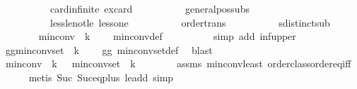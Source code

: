 \begin{isabellebody}
\ \ \ \ \ \ \ \ \ \ card{\isachardot}{\kern0pt}infinite\ ex{\isacharunderscore}{\kern0pt}card\isanewline
\ \ \ \ \ \ \ \ \ \ general{\isacharunderscore}{\kern0pt}pos{\isacharunderscore}{\kern0pt}subs\isanewline
\ \ \ \ \ \ \ \ \ \ less{\isacharunderscore}{\kern0pt}le{\isacharunderscore}{\kern0pt}not{\isacharunderscore}{\kern0pt}le\ less{\isacharunderscore}{\kern0pt}one\isanewline
\ \ \ \ \ \ \ \ \ \ order{\isachardot}{\kern0pt}trans\isanewline
\ \ \ \ \ \ \ \ \ \ sdistinct{\isacharunderscore}{\kern0pt}sub{\isacharparenright}{\kern0pt}\isanewline
\ \ \ \ \ \ \isamarkupfalse%
\ {\isachardoublequoteopen}min{\isacharunderscore}{\kern0pt}conv\ {}\ k\ {\isasymle}\ {}{\isachardoublequoteclose}\ \isamarkupfalse%
\ min{\isacharunderscore}{\kern0pt}conv{\isacharunderscore}{\kern0pt}def\isanewline
\ \ \ \ \ \ \ \ \isamarkupfalse%
\ {\isacharparenleft}{\kern0pt}simp\ add{\isacharcolon}{\kern0pt}\ inf{\isacharunderscore}{\kern0pt}upper{\isacharparenright}{\kern0pt}\isanewline
\ \ \ \ \ \ \isamarkupfalse%
\ gg{}{\isacharcolon}{\kern0pt}{\isachardoublequoteopen}min{\isacharunderscore}{\kern0pt}conv{\isacharunderscore}{\kern0pt}set\ {}\ k\ {\isasymnoteq}\ {\isacharbraceleft}{\kern0pt}{\isacharbraceright}{\kern0pt}{\isachardoublequoteclose}\ \isamarkupfalse%
\ gg\ min{\isacharunderscore}{\kern0pt}conv{\isacharunderscore}{\kern0pt}set{\isacharunderscore}{\kern0pt}def\ \isamarkupfalse%
\ blast\isanewline
\ \ \isamarkupfalse%
\isanewline
\ \ \isamarkupfalse%
\ {\isachardoublequoteopen}min{\isacharunderscore}{\kern0pt}conv\ {}\ k\ {\isacharequal}{\kern0pt}\ {}{\isachardoublequoteclose}\ {\isachardoublequoteopen}min{\isacharunderscore}{\kern0pt}conv{\isacharunderscore}{\kern0pt}set\ {}\ k\ {\isasymnoteq}\ {\isacharbraceleft}{\kern0pt}{\isacharbraceright}{\kern0pt}{\isachardoublequoteclose}\isanewline
\ \ \ \ \isamarkupfalse%
\ assms\ min{\isacharunderscore}{\kern0pt}conv{\isacharunderscore}{\kern0pt}least\ order{\isacharunderscore}{\kern0pt}class{\isachardot}{\kern0pt}order{\isacharunderscore}{\kern0pt}eq{\isacharunderscore}{\kern0pt}iff\isanewline
\ \ \ \ \isamarkupfalse%
\ {\isacharparenleft}{\kern0pt}metis\ Suc{\isacharunderscore}{\kern0pt}{}\ Suc{\isacharunderscore}{\kern0pt}eq{\isacharunderscore}{\kern0pt}plus{}\ le{\isacharunderscore}{\kern0pt}add{}{\isacharcomma}{\kern0pt}\ simp{\isacharparenright}{\kern0pt}\isanewline

\end{isabellebody}
